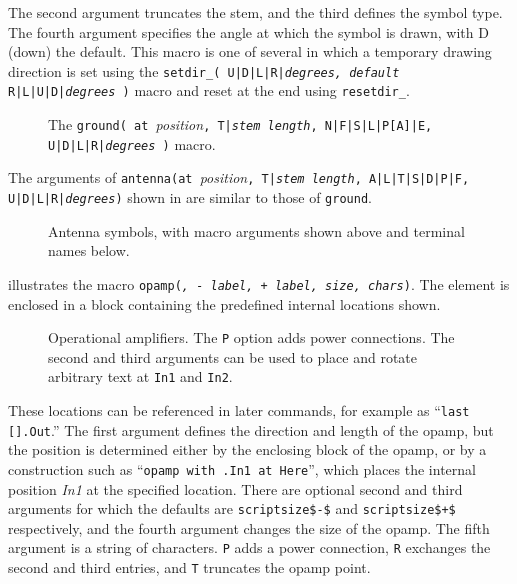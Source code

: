 The second argument truncates
the stem, and the third defines the symbol type.
The fourth argument specifies the angle at which the symbol is drawn,
with D (down) the default.
This macro is one of several in which a temporary drawing direction
is set using the
 {\tt setdir\_( U|D|L|R|{\sl degrees, default} R|L|U|D|{\sl degrees} )}
macro and reset at the end using {\tt resetdir\_}.
\begin{figure}[ht!]
   
   \caption{The 
     {\tt ground( at }{\sl position}{\tt,
       T|{\sl stem length}, N|F|S|L|P[A]|E, U|D|L|R|{\sl degrees} )}
     macro.}
   \label{Grounds}
   \end{figure}

The arguments of
{\tt antenna(at }{\sl position}{\tt,
  T|{\sl stem length}, A|L|T|S|D|P|F, U|D|L|R|{\sl degrees})}
shown in  are similar to those of {\tt ground}.
\begin{figure}[h!]
   
   \caption{Antenna symbols, with macro arguments shown above and
     terminal names below.}
   \label{Antennas}
   \end{figure}

 illustrates the macro
{\tt opamp({\sl\linespec, - label, + label, size, chars})\label{OPAMP}}.
The element is enclosed in a block
containing the predefined internal locations shown.
\begin{figure}[ht]
   
   \caption{Operational amplifiers.  The {\tt P} option adds
     power connections.  The second and third arguments can be used
     to place and rotate arbitrary text at {\tt In1} and {\tt In2}.}
   \label{Opamp}
   \end{figure}
These locations can be referenced in later
commands, for example as ``{\tt last [].Out}.''
The first argument defines the direction and length of the opamp, but the
position is determined either by the enclosing block of the opamp,
or by a construction such as ``{\tt opamp with .In1 at Here}'', which places
the internal position {\sl In1} at the specified location.
There are optional second and third arguments for which the defaults
are {\tt {}scriptsize\$-\$} and {\tt {}scriptsize\$+\$}
respectively, and the fourth argument changes the size of the opamp.
The fifth argument is a string of characters.  {\tt P}
adds a power connection, {\tt R} exchanges the second and
third entries, and {\tt T} truncates the opamp point.

